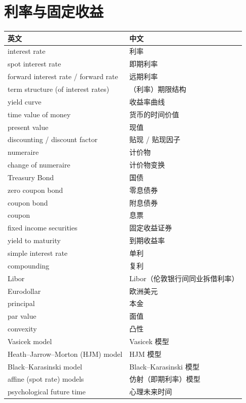 \section{利率与固定收益}

\begin{center}
\begin{tabular}{@{}L{6.4cm}L{7.4cm}@{}}
\toprule
英文 & 中文 \\
\midrule
interest rate & 利率 \\
spot interest rate & 即期利率 \\
forward interest rate / forward rate & 远期利率 \\
term structure (of interest rates) & （利率）期限结构 \\
yield curve & 收益率曲线 \\
time value of money & 货币的时间价值 \\
present value & 现值 \\
discounting / discount factor & 贴现 / 贴现因子 \\
numeraire & 计价物 \\
change of numeraire & 计价物变换 \\
Treasury Bond & 国债 \\
zero coupon bond & 零息债券 \\
coupon bond & 附息债券 \\
coupon & 息票 \\
fixed income securities & 固定收益证券 \\
yield to maturity & 到期收益率 \\
simple interest rate & 单利 \\
compounding & 复利 \\
Libor & Libor（伦敦银行间同业拆借利率） \\
Eurodollar & 欧洲美元 \\
principal & 本金 \\
par value & 面值 \\
convexity & 凸性 \\
Vasicek model & Vasicek 模型 \\
Heath--Jarrow--Morton (HJM) model & HJM 模型 \\
Black--Karasinski model & Black--Karasinski 模型 \\
affine (spot rate) models & 仿射（即期利率）模型 \\
psychological future time & 心理未来时间 \\
\bottomrule
\end{tabular}
\end{center}

